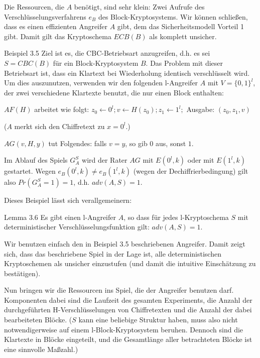 \documentclass[a4paper]{article}
\begin{document}
\begin{multicols}{3}
    Die Ressourcen, die $A$ benötigt, sind sehr klein: Zwei Aufrufe des Verschlüsselungsverfahrens $e_B$ des Block-Kryptosystems. Wir können schließen, dass es einen effizienten Angreifer $A$ gibt, dem das Sicherheitsmodell Vorteil 1 gibt. Damit gilt das Kryptoschema $ECB(B)$ als komplett unsicher.

    Beispiel 3.5 Ziel ist es, die CBC-Betriebsart anzugreifen, d.h. es sei $S=CBC(B)$ für ein Block-Kryptosystem $B$. Das Problem mit dieser Betriebsart ist, dass ein Klartext bei Wiederholung identisch verschlüsselt wird. Um dies auszunutzen, verwenden wir den folgenden l-Angreifer $A$ mit $V=\{0,1\}^l$, der zwei verschiedene Klartexte benutzt, die nur einen Block enthalten:
    \begin{itemize*}
        \item $AF(H)$ arbeitet wie folgt: $z_0\leftarrow 0^l;v\leftarrow H(z_0);z_1\leftarrow 1^l;$ Ausgabe: $(z_0,z_1,v)$
        \item ($A$ merkt sich den Chiffretext zu $x=0^l$.)
        \item $AG(v,H,y)$ tut Folgendes: falls $v=y$, so gib $0$ aus, sonst $1$.
    \end{itemize*}

    Im Ablauf des Spiels $G^S_A$ wird der Rater $AG$ mit $E(0^l,k)$ oder mit $E(1^l,k)$ gestartet. Wegen $e_B(0^l,k)\not=e_B(1^l,k)$ (wegen der Dechiffrierbedingung) gilt also $Pr(G^S_A=1)=1$, d.h. $adv(A,S)=1$.

    Dieses Beispiel lässt sich verallgemeinern:

    Lemma 3.6 Es gibt einen l-Angreifer $A$, so dass für jedes l-Kryptoschema $S$ mit deterministischer Verschlüsselungsfunktion gilt: $adv(A,S) = 1$.

    Wir benutzen einfach den in Beispiel 3.5 beschriebenen Angreifer. Damit zeigt sich, dass das beschriebene Spiel in der Lage ist, alle deterministischen Kryptoschemen als unsicher einzustufen (und damit die intuitive Einschätzung zu bestätigen).

    Nun bringen wir die Ressourcen ins Spiel, die der Angreifer benutzen darf. Komponenten dabei sind die Laufzeit des gesamten Experiments, die Anzahl der durchgeführten H-Verschlüsselungen von Chiffretexten und die Anzahl der dabei bearbeiteten Blöcke. ($S$ kann eine beliebige Struktur haben, muss also nicht notwendigerweise auf einem l-Block-Kryptosystem beruhen. Dennoch sind die Klartexte in Blöcke eingeteilt, und die Gesamtlänge aller betrachteten Blöcke ist eine sinnvolle Maßzahl.)


\end{multicols}
\end{document}
